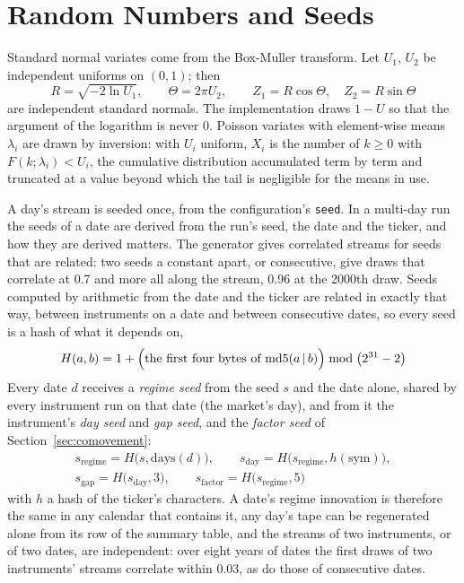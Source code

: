 \documentclass[11pt,a4paper]{article}
\newcommand{\key}[1]{\texttt{#1}}
\theoremstyle{paper}
\begin{document}
\section{Random Numbers and Seeds}

Standard normal variates come from the Box-Muller transform. Let $U_1$, $U_2$ be independent uniforms on $(0,1)$; then
\begin{equation}
R=\sqrt{-2\ln U_1},\qquad \Theta=2\pi U_2,\qquad Z_1=R\cos\Theta,\quad Z_2=R\sin\Theta
\end{equation}
are independent standard normals. The implementation draws $1-U$ so that the argument of the logarithm is never 0. Poisson variates with element-wise means $\lambda_i$ are drawn by inversion: with $U_i$ uniform, $X_i$ is the number of $k\ge 0$ with $F(k;\lambda_i)<U_i$, the cumulative distribution accumulated term by term and truncated at a value beyond which the tail is negligible for the means in use.

A day's stream is seeded once, from the configuration's \key{seed}. In a multi-day run the seeds of a date are derived from the run's seed, the date and the ticker, and how they are derived matters. The generator gives correlated streams for seeds that are related: two seeds a constant apart, or consecutive, give draws that correlate at 0.7 and more all along the stream, 0.96 at the 2000th draw. Seeds computed by arithmetic from the date and the ticker are related in exactly that way, between instruments on a date and between consecutive dates, so every seed is a hash of what it depends on,
\begin{equation}
H(a,b)=1+\Bigl(\text{the first four bytes of }\mathrm{md5}(a\,|\,b)\Bigr)\bmod\bigl(2^{31}-2\bigr)
\end{equation}
Every date $d$ receives a \emph{regime seed} from the seed $s$ and the date alone, shared by every instrument run on that date (the market's day), and from it the instrument's \emph{day seed} and \emph{gap seed}, and the \emph{factor seed} of Section~\ref{sec:comovement}:
\begin{equation}
\begin{gathered}
s_{\text{regime}}=H\bigl(s,\text{days}(d)\bigr),\qquad s_{\text{day}}=H\bigl(s_{\text{regime}},h(\text{sym})\bigr),\\
s_{\text{gap}}=H\bigl(s_{\text{day}},3\bigr),\qquad s_{\text{factor}}=H\bigl(s_{\text{regime}},5\bigr)
\end{gathered}
\end{equation}
with $h$ a hash of the ticker's characters. A date's regime innovation is therefore the same in any calendar that contains it, any day's tape can be regenerated alone from its row of the summary table, and the streams of two instruments, or of two dates, are independent: over eight years of dates the first draws of two instruments' streams correlate within 0.03, as do those of consecutive dates.
\end{document}
